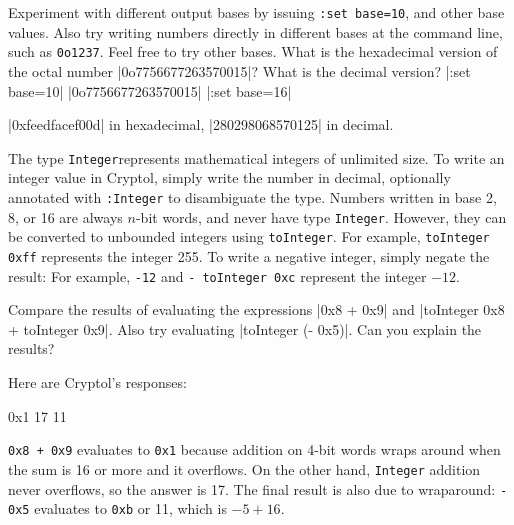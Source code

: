 \restartrepl
\begin{Exercise}\label{ex:setBase}
  Experiment with different output bases by issuing {\tt :set
    base=10}, and other base values. Also try writing numbers directly
  in different bases at the command line, such as {\tt 0o1237}.  Feel
  free to try other bases. What is the hexadecimal version of the
  octal number \replin|0o7756677263570015|? What is the decimal version?
  \hidereplin|:set base=10|
  \hidereplin|0o7756677263570015|
  \hidereplin|:set base=16|
\end{Exercise}
\begin{Answer}
\replout|0xfeedfacef00d| in hexadecimal, \replout|280298068570125| in decimal.
\end{Answer}



The type \texttt{Integer}\indTheIntegerType represents mathematical
integers of unlimited size. To write an integer value in Cryptol,
simply write the number in decimal, optionally annotated with
\texttt{:Integer} to disambiguate the type. Numbers written in base 2,
8, or 16 are always $n$-bit words, and never have type
\texttt{Integer}. However, they can be converted to unbounded integers
using \texttt{toInteger}. For example, \texttt{toInteger 0xff}
represents the integer 255. To write a negative integer, simply negate
the result: For example, \texttt{-12} and \texttt{- toInteger 0xc}
represent the integer $-12$.

\restartrepl
\begin{Exercise}\label{ex:int:1}
  Compare the results of evaluating the expressions \replin|0x8 + 0x9|
  and \replin|toInteger 0x8 + toInteger 0x9|. Also try evaluating
  \replin|toInteger (- 0x5)|. Can you explain the results?
\end{Exercise}
\begin{Answer}
Here are Cryptol's responses:
\begin{reploutVerb}
  0x1
  17
  11
\end{reploutVerb}
\texttt{0x8 + 0x9} evaluates to \texttt{0x1} because addition on 4-bit
words wraps around when the sum is 16 or more and it overflows. On the
other hand, \texttt{Integer} addition never overflows, so the answer
is 17. The final result is also due to wraparound: \texttt{- 0x5}
evaluates to \texttt{0xb} or 11, which is $-5 + 16$.
\end{Answer}

